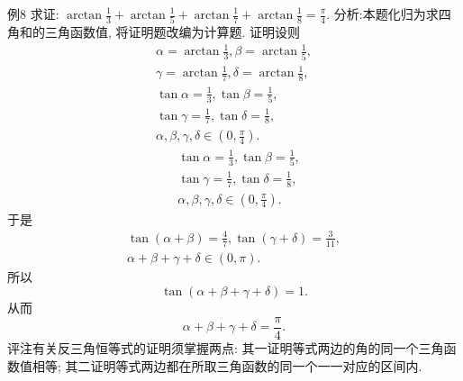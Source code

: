 例8 求证: $\arctan \frac{1}{3}+\arctan \frac{1}{5}+\arctan \frac{1}{7}+\arctan \frac{1}{8}=\frac{\pi}{4}$.
分析:本题化归为求四角和的三角函数值, 将证明题改编为计算题.
证明设则
$$
\begin{gathered}
\alpha=\arctan \frac{1}{3}, \beta=\arctan \frac{1}{5}, \\
\gamma=\arctan \frac{1}{7}, \delta=\arctan \frac{1}{8}, \\
\tan \alpha=\frac{1}{3}, \tan \beta=\frac{1}{5}, \\
\tan \gamma=\frac{1}{7}, \tan \delta=\frac{1}{8}, \\
\alpha, \beta, \gamma, \delta \in\left(0, \frac{\pi}{4}\right) .
\end{gathered}
$$
$$
\begin{aligned}
& \tan \alpha=\frac{1}{3}, \tan \beta=\frac{1}{5}, \\
& \tan \gamma=\frac{1}{7}, \tan \delta=\frac{1}{8}, \\
& \alpha, \beta, \gamma, \delta \in\left(0, \frac{\pi}{4}\right) .
\end{aligned}
$$
于是
$$
\begin{gathered}
\tan (\alpha+\beta)=\frac{4}{7}, \tan (\gamma+\delta)=\frac{3}{11}, \\
\alpha+\beta+\gamma+\delta \in(0, \pi) .
\end{gathered}
$$
所以
$$
\tan (\alpha+\beta+\gamma+\delta)=1 .
$$
从而
$$
\alpha+\beta+\gamma+\delta=\frac{\pi}{4} .
$$
评注有关反三角恒等式的证明须掌握两点: 其一证明等式两边的角的同一个三角函数值相等; 其二证明等式两边都在所取三角函数的同一个一一对应的区间内.



